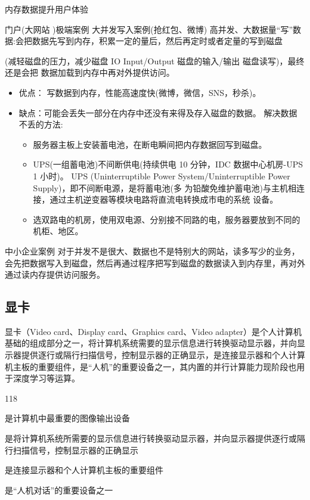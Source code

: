 \begin{ascolorbox17}{内存数据提升用户体验}

\begin{ascboxC}{门户(大网站 )极端案例}
大并发写入案例(抢红包、微博) 高并发、大数据量“写”数据:会把数据先写到内存，积累一定的量后，然后再定时或者定量的写到磁盘

(减轻磁盘的压力，减少磁盘 IO Input/Output 磁盘的输入/输出 磁盘读写)，最终还是会把 数据加载到内存中再对外提供访问。
\begin{itemize}
	\item 优点： 写数据到内存，性能高速度快(微博，微信，SNS，秒杀)。
	\item 缺点：可能会丢失一部分在内存中还没有来得及存入磁盘的数据。 解决数据不丢的方法:
	\begin{itemize}
		\item 服务器主板上安装蓄电池，在断电瞬间把内存数据回写到磁盘。
		\item UPS(一组蓄电池)不间断供电(持续供电 10 分钟，IDC 数据中心机房-UPS 1 小时)。 UPS
		(Uninterruptible Power System/Uninterruptible Power Supply)，即不间断电源，是将蓄电池(多 为铅酸免维护蓄电池)与主机相连接，通过主机逆变器等模块电路将直流电转换成市电的系统 设备。
		\item 选双路电的机房，使用双电源、分别接不同路的电，服务器要放到不同的机柜、地区。
	\end{itemize}
\end{itemize}
\end{ascboxC}
\begin{ascboxC}{中小企业案例}
对于并发不是很大、数据也不是特别大的网站，读多写少的业务，会先把数据写入到磁盘，然后再通过程序把写到磁盘的数据读入到内存里，再对外通过读内存提供访问服务。
\end{ascboxC}
\end{ascolorbox17}
\subsection{显卡}
显卡（Video card、Display card、Graphics card、Video adapter）是个人计算机基础的组成部分之一，将计算机系统需要的显示信息进行转换驱动显示器，并向显示器提供逐行或隔行扫描信号，控制显示器的正确显示，是连接显示器和个人计算机主板的重要组件，是“人机”的重要设备之一，其内置的并行计算能力现阶段也用于深度学习等运算。

\begin{dinglist}{118}
\item 是计算机中最重要的图像输出设备
\item 是将计算机系统所需要的显示信息进行转换驱动显示器，并向显示器提供逐行或隔行扫描信号，控制显示器的正确显示
\item 是连接显示器和个人计算机主板的重要组件
\item 是“人机对话”的重要设备之一
\end{dinglist}

